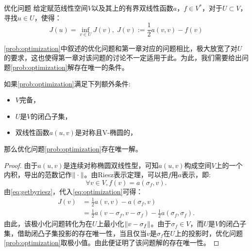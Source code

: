 \begin{definition}{优化问题}
  \label{prob:optimization}
  给定赋范线性空间$V$以及其上的有界双线性函数$a$，$f\in V^{*}$，对于$U\subset V$，寻找$u\in U$，使得：
  \begin{equation}
    \label{eq:optimization}
    J(u)=\inf_{v\in U}J(v),\; J(v):=\frac{1}{2}a(v,v)-f(v)
  \end{equation}
\end{definition}
\ref{prob:optimization}中叙述的优化问题和第一章对应的问题相比，极大放宽了对$U$的要求，这也使得第一章对该问题的讨论不一定适用于此。为此，我们需要给出问题\ref{prob:optimization}解存在唯一的条件。
\begin{theorem}
  如果\ref{prob:optimization}满足下列额外条件:
  \begin{itemize}
    \item $V$完备，
    \item $U$是$V$的闭凸子集，
    \item 双线性函数$a(u,v)$是对称且V-椭圆的，
  \end{itemize}
  那么优化问题\ref{prob:optimization}存在唯一解。
\end{theorem}
\begin{proof}
  由于$a(u,v)$是连续对称椭圆双线性型，可知$a(u,v)$构成空间$V$上的一个内积，导出的范数记作$\|\cdot\|$。由Riesz表示定理，可以把$f$用$a$表示，即:
  \begin{equation}
    \label{eq:getbyriesz}
    \forall v\in V, f(v)=a(\sigma_{f},v).
  \end{equation}
  由\eqref{eq:getbyriesz}，代入\eqref{eq:optimization}可得：
  \begin{equation}
    \label{eq:simplifyJ}
    \begin{aligned}
      J(v)&=\frac{1}{2}a(v,v)-a(\sigma_{f},v)\\
      &=\frac{1}{2}a(v-\sigma_{f},v-\sigma_{f})-\frac{1}{2}a(\sigma_{f},\sigma_{f}).
    \end{aligned}
  \end{equation}
  由此，该极小化问题转化为在$U$上最小化$\|v-\sigma_{f}\|$。由于$\sigma_{f}\in V$，而$U$是$V$的闭凸子集，借助闭凸子集投影的存在唯一性，当且仅当$v$是$\sigma_{f}$在$U$上的投影时，优化问题\ref{prob:optimization}取极小值。由此便证明了该问题解的存在唯一性。
\end{proof}
